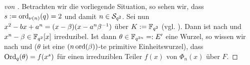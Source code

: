\begin{proof}[von ]
  Betrachten wir die vorliegende Situation, so sehen wir, dass
  $s := \ord_{\nu(n)}(q) = 2$ und damit $n \in \S_{q^2}$.
  Sei nun 
  $x^2-bx+a^n = (x -\beta)(x -a^n\beta\inv)$ über $K := \F_{q^2}$
  (vgl. ).
  Dann ist 
  nach  und  
  $x^n-\beta \in \F_{q^2}[x]$ irreduzibel.
  Ist dann $\theta \in \F_{q^{2n}} =: E'$ eine Wurzel, so wissen wir nach
   und 
  ($\theta$ ist eine $(n\ord(\beta))$-te primitive Einheitswurzel), dass
  $\Ord_q(\theta) = f(x^s)$ für einen irreduziblen Teiler $f(x)$ von
  $\Phi_n(x)$ über $F$. 
  

\end{proof}
